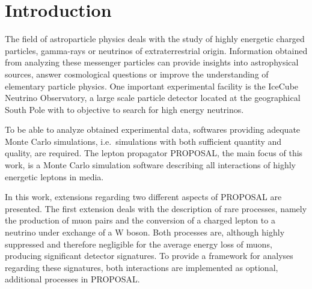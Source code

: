 \chapter{Introduction}

The field of astroparticle physics deals with the study of highly energetic charged particles, gamma-rays or neutrinos of extraterrestrial origin.
Information obtained from analyzing these messenger particles can provide insights into astrophysical sources, answer cosmological questions or improve the understanding of elementary particle physics.
One important experimental facility is the IceCube Neutrino Observatory, a large scale particle detector located at the geographical South Pole with to objective to search for high energy neutrinos.

To be able to analyze obtained experimental data, softwares providing adequate Monte Carlo simulations, i.e.\ simulations with both sufficient quantity and quality, are required. 
The lepton propagator PROPOSAL, the main focus of this work, is a Monte Carlo simulation software describing all interactions of highly energetic leptons in media.

In this work, extensions regarding two different aspects of PROPOSAL are presented.
The first extension deals with the description of rare processes, namely the production of muon pairs and the conversion of a charged lepton to a neutrino under exchange of a W boson.
Both processes are, although highly suppressed and therefore negligible for the average energy loss of muons, producing significant detector signatures.
To provide a framework for analyses regarding these signatures, both interactions are implemented as optional, additional processes in PROPOSAL.